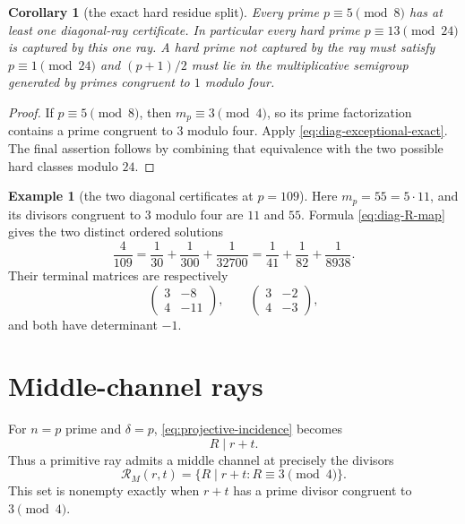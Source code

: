 \documentclass[11pt]{article}
\newtheorem{corollary}[theorem]{Corollary}
\theoremstyle{definition}
\newtheorem{example}[theorem]{Example}
\theoremstyle{remark}
\newcommand{\1}{\mathbf 1}
\begin{document}
\begin{corollary}[the exact hard residue split]
Every prime $p\equiv5\pmod8$ has at least one diagonal-ray certificate.  In
particular every hard prime $p\equiv13\pmod{24}$ is captured by this one ray.
A hard prime not captured by the ray must satisfy $p\equiv1\pmod{24}$ and
$(p+1)/2$ must lie in the multiplicative semigroup generated by primes
congruent to $1$ modulo four.
\end{corollary}

\begin{proof}
If $p\equiv5\pmod8$, then $m_p\equiv3\pmod4$, so its prime factorization
contains a prime congruent to $3$ modulo four.  Apply
\eqref{eq:diag-exceptional-exact}.  The final assertion follows by combining
that equivalence with the two possible hard classes modulo $24$.
\end{proof}


\begin{example}[the two diagonal certificates at $p=109$]
Here $m_p=55=5\cdot11$, and its divisors congruent to $3$ modulo four are
$11$ and $55$.  Formula \eqref{eq:diag-R-map} gives the two distinct ordered
solutions
\[
 \frac4{109}=\frac1{30}+\frac1{300}+\frac1{32700}
 =\frac1{41}+\frac1{82}+\frac1{8938}.
\]
Their terminal matrices are respectively
\[
 \begin{pmatrix}3&-8\\4&-11\end{pmatrix},
 \qquad
 \begin{pmatrix}3&-2\\4&-3\end{pmatrix},
\]
and both have determinant $-1$.
\end{example}

\section{Middle-channel rays}

For $n=p$ prime and $\delta=p$, \eqref{eq:projective-incidence} becomes
\begin{equation}\label{eq:middle-ray-condition}
 R\mid r+t.
\end{equation}
Thus a primitive ray admits a middle channel at precisely the divisors
\begin{equation}\label{eq:middle-R-set}
 \mathscr R_M(r,t)=\{R\mid r+t:R\equiv3\pmod4\}.
\end{equation}
This set is nonempty exactly when $r+t$ has a prime divisor congruent to
$3\pmod4$.
\end{document}
